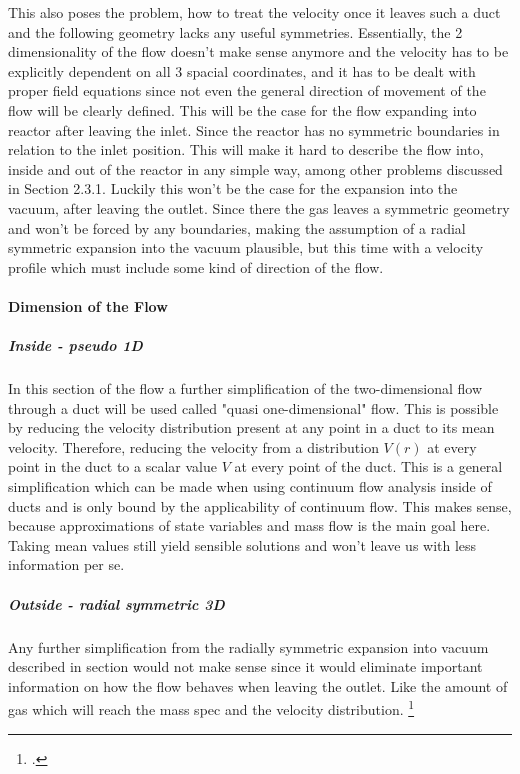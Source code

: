 
	\noindent This also poses the problem, how to treat the velocity once it leaves such a duct and the following geometry lacks any useful symmetries.
	Essentially, the 2 dimensionality of the flow doesn't make sense anymore and the velocity has to be explicitly dependent on all 3 spacial coordinates, and it has to be dealt with proper field equations since not even the general direction of movement of the flow will be clearly defined.
	This will be the case for the flow expanding into reactor after leaving the inlet.
	Since the reactor has no symmetric boundaries in relation to the inlet position.
	This will make it hard to describe the flow into, inside and out of the reactor in any simple way, among other problems discussed in Section 2.3.1.
	Luckily this won't be the case for the expansion into the vacuum, after leaving the outlet.
	Since there the gas leaves a symmetric geometry and won't be forced by any boundaries, making the assumption of a radial symmetric expansion into the vacuum plausible, but this time with a velocity profile which must include some kind of direction of the flow.\\

\paragraph{Dimension of the Flow}

	\subparagraph{Inside - pseudo 1D}

		In this section of the flow a further simplification of the two-dimensional flow through a duct will be used called "quasi one-dimensional" flow.
		This is possible by reducing the velocity distribution present at any point in a duct to its mean velocity.
		Therefore, reducing the velocity from a distribution $V(r)$ at every point in the duct to a scalar value $V$ at every point of the duct.
		This is a general simplification which can be made when using continuum flow analysis inside of ducts and is only bound by the applicability of continuum flow.
		This makes sense, because approximations of state variables and mass flow is the main goal here.
		Taking mean values still yield sensible solutions and won't leave us with less information per se.

	\subparagraph{Outside - radial symmetric 3D}

		Any further simplification from the radially symmetric expansion into vacuum described in section would not make sense since it would eliminate important information on how the flow behaves when leaving the outlet.
		Like the amount of gas which will reach the mass spec and the velocity distribution.
\footcite[][120]{anderson2021modern}

